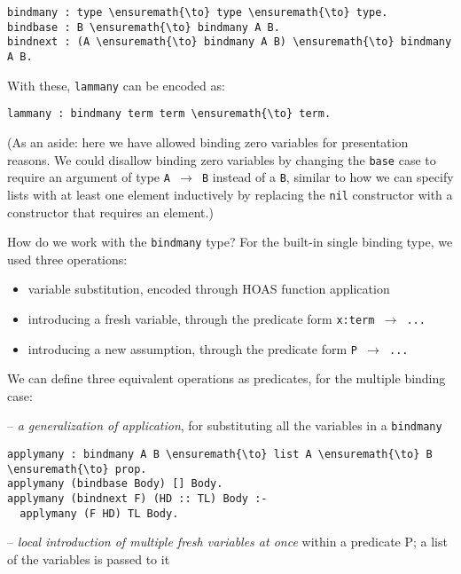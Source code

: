 \begin{verbatim}
bindmany : type \ensuremath{\to} type \ensuremath{\to} type.
bindbase : B \ensuremath{\to} bindmany A B.
bindnext : (A \ensuremath{\to} bindmany A B) \ensuremath{\to} bindmany A B.
\end{verbatim}

With these, \texttt{lammany} can be encoded as:

\begin{verbatim}
lammany : bindmany term term \ensuremath{\to} term.
\end{verbatim}

(As an aside: here we have allowed binding zero variables for
presentation reasons. We could disallow binding zero variables by
changing the \texttt{base} case to require an argument of type
\texttt{A\ \ensuremath{\to}\ B} instead of a \texttt{B}, similar to how
we can specify lists with at least one element inductively by replacing
the \texttt{nil} constructor with a constructor that requires an
element.)

How do we work with the \texttt{bindmany} type? For the built-in single
binding type, we used three operations:

\begin{itemize}
\itemsep1pt\parskip0pt
\item
  variable substitution, encoded through HOAS function application
\item
  introducing a fresh variable, through the predicate form
  \texttt{x:term\ \ensuremath{\to}\ ...}
\item
  introducing a new assumption, through the predicate form
  \texttt{P\ \ensuremath{\to}\ ...}
\end{itemize}

We can define three equivalent operations as predicates, for the
multiple binding case:

-- \emph{a generalization of application}, for substituting all the
variables in a \texttt{bindmany}

\begin{verbatim}
applymany : bindmany A B \ensuremath{\to} list A \ensuremath{\to} B \ensuremath{\to} prop.
applymany (bindbase Body) [] Body.
applymany (bindnext F) (HD :: TL) Body :-
  applymany (F HD) TL Body.
\end{verbatim}

-- \emph{local introduction of multiple fresh variables at once} within
a predicate P; a list of the variables is passed to it

